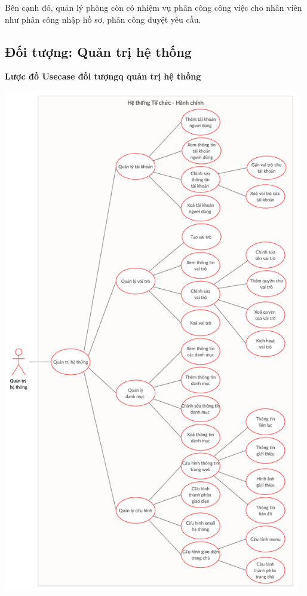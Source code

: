 Bên cạnh đó, quản lý phòng còn có nhiệm vụ phân công công việc cho nhân viên như phân công nhập hồ sơ, phân công duyệt yêu cầu.

\subsection{Đối tượng: Quản trị hệ thống}
\textbf{Lược đồ Usecase đối tượngq quản trị hệ thống}
\begin{center}
  \captionsetup{type=figure}
  \includegraphics[width=13cm]{img/usecase/admin.png}
\end{center}

